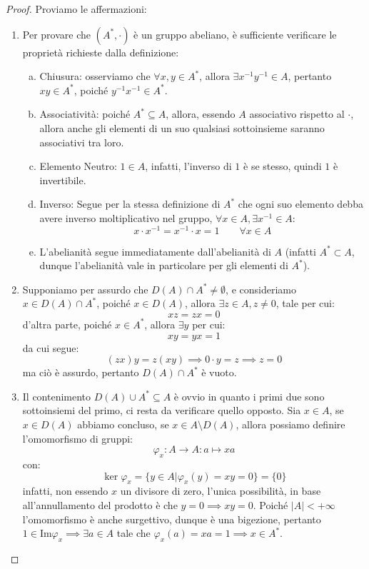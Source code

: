 \documentclass[11pt]{scrartcl}
\begin{document}
\begin{proof}
    Proviamo le affermazioni:
    \begin{enumerate}[(1)]
        \item Per provare che $(A^*, \cdot)$ è un gruppo abeliano, è sufficiente verificare le proprietà richieste dalla definizione:
        \begin{enumerate}[(a)]
            \item Chiusura: osserviamo che $\forall x,y \in A^*$, allora $\exists x^{-1}y^{-1} \in A$, pertanto $xy \in A^*$, poiché $y^{-1}x^{-1} \in A^*$. 
            \item Associatività: poiché $A^* \subseteq A$, allora, essendo $A$ associativo rispetto al $\cdot$, allora anche gli elementi di un suo qualsiasi sottoinsieme saranno associativi tra loro. 
            \item Elemento Neutro: $1 \in A$, infatti, l'inverso di $1$ è se stesso, quindi $1$ è invertibile.
            \item Inverso: Segue per la stessa definizione di $A^*$ che ogni suo elemento debba avere inverso moltiplicativo nel gruppo, $\forall x \in A, \exists x^{-1} \in A$:
                \[ x \cdot x^{-1} = x^{-1} \cdot x = 1
                \qquad
                \forall x \in A
                \]
            \item L'abelianità segue immediatamente dall'abelianità di $A$ (infatti $A^* \subset A$, dunque l'abelianità vale in particolare per gli elementi di $A^*$).
        \end{enumerate}
        \item Supponiamo per assurdo che $D(A) \cap A^* \neq \emptyset$, e consideriamo $x \in D(A) \cap A^*$, poiché $x \in D(A)$, allora $\exists z \in A, z \ne 0$, tale per cui:
		    \[ xz = zx = 0
		        \]
            d'altra parte, poiché $x \in A^*$, allora $\exists y$ per cui:
            \[  xy = yx = 1
                    \]
            da cui segue:
            \[ (zx)y = z(xy) \implies 0 \cdot y = z \implies z = 0
                    \]
            ma ciò è assurdo, pertanto $D(A) \cap A^*$ è vuoto.
        \item Il contenimento $D(A) \cup A^* \subseteq A$ è ovvio in quanto i primi due sono sottoinsiemi del primo, ci resta da verificare quello opposto. Sia $x \in A$, se $x \in D(A)$ abbiamo concluso,
            se $x \in A \setminus D(A)$, allora possiamo definire l'omomorfismo di gruppi:
                \[ \varphi_x : A \longrightarrow A : a \longmapsto xa
                    \]
            con:
                \[ \ker \varphi_{x} = \{y \in A | \varphi_x(y) = xy = 0\} = \{0\}
                    \]
            infatti, non essendo $x$ un divisore di zero, l'unica possibilità, in base all'annullamento del prodotto è che $y = 0 \implies xy = 0$. Poiché $|A| < +\infty$ l'omomorfismo è anche surgettivo, dunque è una bigezione,
            pertanto $1 \in \text{Im} \varphi_x \implies \exists a \in A$ tale che $\varphi_x(a) = xa = 1 \implies x \in A^*$.
    \end{enumerate}
\end{proof}
\end{document}
